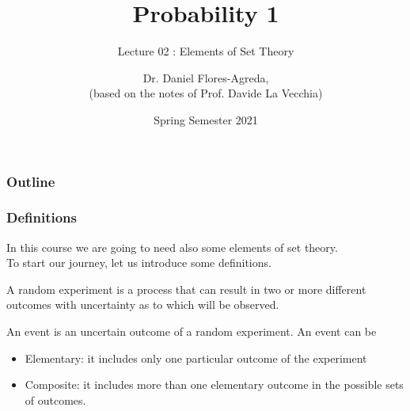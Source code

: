 \documentclass[notes=show,handout]{beamer}\usepackage[]{graphicx}\usepackage[]{color}
\begin{document}
\title[S110015]{Probability 1}
\subtitle{Lecture 02 : Elements of Set Theory}
\author[Flores-Agreda, La Vecchia]{Dr. Daniel Flores-Agreda, \\[0.5em] \tiny{(based on the notes of Prof. Davide La Vecchia)}}
\date{Spring Semester 2021}

\begin{frame}
\titlepage
\end{frame}

\begin{frame}
\frametitle{Outline}
\tableofcontents
\end{frame}

\begin{frame}
\frametitle{Definitions}

In this course we are going to need also some elements of \color{blue} set theory.\color{black}\\

To start our journey, let us introduce some definitions.

\begin{definition}
A random experiment  is a process that can result in two or more different outcomes with uncertainty as to which will be observed.
\end{definition}

\begin{definition}
An event is an uncertain outcome of a random experiment. An event can be
\begin{itemize}
\item Elementary: it includes only one particular outcome of the experiment
\item Composite: it includes more than one elementary outcome in the possible sets of outcomes.
\end{itemize}
\end{definition}

\end{frame}
\end{document}
